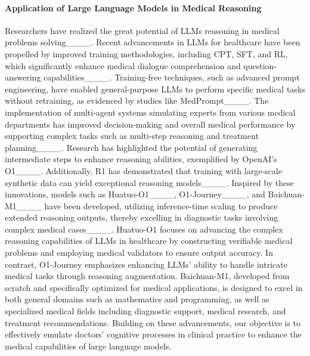 \paragraph{Application of Large Language Models in Medical Reasoning} Researchers have realized the great potential of LLMs reasoning in medical problems solving____. Recent advancements in LLMs for healthcare have been propelled by improved training methodologies, including CPT, SFT, and RL, which significantly enhance medical dialogue comprehension and question-answering capabilities____. Training-free techniques, such as advanced prompt engineering, have enabled general-purpose LLMs to perform specific medical tasks without retraining, as evidenced by studies like MedPrompt____. The implementation of multi-agent systems simulating experts from various medical departments has improved decision-making and overall medical performance by supporting complex tasks such as multi-step reasoning and treatment planning____. Research has highlighted the potential of generating intermediate steps to enhance reasoning abilities, exemplified by OpenAI’s O1____. Additionally, R1 has demonstrated that training with large-scale synthetic data can yield exceptional reasoning models____. Inspired by these innovations, models such as Huatuo-O1____, O1-Journey____, and Baichuan-M1____ have been developed, utilizing inference-time scaling to produce extended reasoning outputs, thereby excelling in diagnostic tasks involving complex medical cases____. Huatuo-O1 focuses on advancing the complex reasoning capabilities of LLMs in healthcare by constructing verifiable medical problems and employing medical validators to ensure output accuracy. In contrast, O1-Journey emphasizes enhancing LLMs' ability to handle intricate medical tasks through reasoning augmentation. Baichuan-M1, developed from scratch and specifically optimized for medical applications, is designed to excel in both general domains such as mathematics and programming, as well as specialized medical fields including diagnostic support, medical research, and treatment recommendations. Building on these advancements, our objective is to effectively emulate doctors' cognitive processes in clinical practice to enhance the medical capabilities of large language models.

